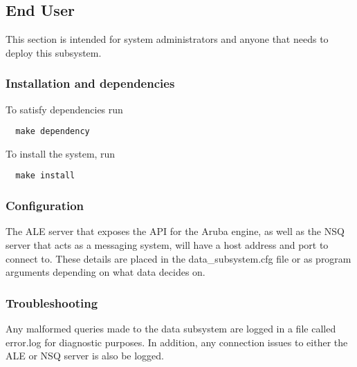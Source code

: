 \subsection{End User}
This section is intended for system administrators and anyone that needs to deploy this subsystem.
\subsubsection{Installation and dependencies}
To satisfy dependencies run
\begin{verbatim}
  make dependency
\end{verbatim}
To install the system, run
\begin{verbatim}
  make install
\end{verbatim}
\subsubsection{Configuration}
The ALE server that exposes the API for the Aruba engine, as well as the NSQ server that acts as a messaging system, will have a host address and port to connect to. These details are placed in the data_subsystem.cfg file or as program arguments depending on what data decides on.
\subsubsection{Troubleshooting}
Any malformed queries made to the data subsystem are logged in a file called error.log for diagnostic purposes. In addition, any connection issues to either the ALE or NSQ server is also be logged.

